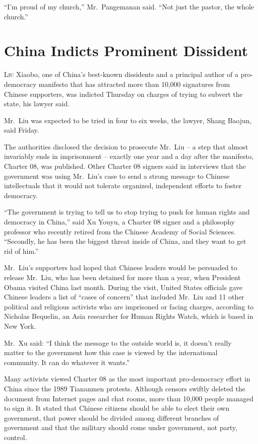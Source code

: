 ﻿\documentclass[12pt]{article}
\begin{document}
``I'm proud of my church,'' Mr.~Pangemanan said. ``Not just the pastor, the whole church.''

\section{China Indicts Prominent Dissident}

\lettrine{L}{iu} Xiaobo, one of China's best-known dissidents and a
principal author of a pro-democracy manifesto that has attracted more than 10,000 signatures from
Chinese supporters, was indicted Thursday on charges of trying to subvert the state, his lawyer
said.

Mr.~Liu was expected to be tried in four to six weeks, the lawyer, Shang Baojun, said Friday.

The authorities disclosed the decision to prosecute Mr.~Liu -- a step that almost invariably ends in
imprisonment -- exactly one year and a day after the manifesto, Charter 08, was published. Other
Charter 08 signers said in interviews that the government was using Mr.~Liu's case to send a strong
message to Chinese intellectuals that it would not tolerate organized, independent efforts to foster
democracy.

``The government is trying to tell us to stop trying to push for human rights and democracy in
China,'' said Xu Youyu, a Charter 08 signer and a philosophy professor who recently retired from the
Chinese Academy of Social Sciences. ``Secondly, he has been the biggest threat inside of China, and
they want to get rid of him.''

Mr.~Liu's supporters had hoped that Chinese leaders would be persuaded to release Mr.~Liu, who has
been detained for more than a year, when President Obama visited China last month. During the visit,
United States officials gave Chinese leaders a list of ``cases of concern'' that included Mr.~Liu
and 11 other political and religious activists who are imprisoned or facing charges, according to
Nicholas Bequelin, an Asia researcher for Human Rights Watch, which is based in New York.

Mr.~Xu said: ``I think the message to the outside world is, it doesn't really matter to the
government how this case is viewed by the international community. It can do whatever it wants.''

Many activists viewed Charter 08 as the most important pro-democracy effort in China since the 1989
Tiananmen protests. Although censors swiftly deleted the document from Internet pages and chat
rooms, more than 10,000 people managed to sign it. It stated that Chinese citizens should be able to
elect their own government, that power should be divided among different branches of government and
that the military should come under government, not party, control.
\end{document}

